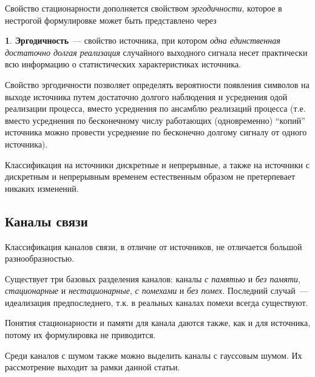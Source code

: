 \documentclass[12pt,a4paper,openright]{book}
\theoremstyle{definition}
\newtheorem{definition}{\textls[150]{Определение}}[chapter]
\numberwithin{equation}{chapter}
\begin{document}
	Свойство стационарности дополняется свойством \textit{эргодичности}, которое в нестрогой формулировке может быть представлено через
	\begin{definition}
		\textbf{Эргодичность}~--- свойство источника, при котором \textit{одна единственная достаточно долгая реализация} случайного выходного сигнала несет практически всю информацию о статистических характеристиках источника.
	\end{definition}
	Свойство эргодичности позволяет определять вероятности появления символов на выходе источника путем достаточно долгого наблюдения и усреднения одой реализации процесса, вместо усреднения по ансамблю реализаций процесса (т.е. вместо усреднения по бесконечному числу работающих (одновременно) ``копий'' источника можно провести усреднение по бесконечно долгому сигналу от одного источника).

	Классификация на источники дискретные и непрерывные, а также на источники с дискретным и непрерывным временем естественным образом не претерпевает никаких изменений.





	\subsection{Каналы связи}

	Классификация каналов связи, в отличие от источников, не отличается большой разнообразностью.

	Существует три базовых разделения каналов: каналы \textit{с памятью} и \textit{без памяти}, \textit{стационарные} и \textit{нестационарные}, \textit{с помехами} и \textit{без помех}. Последний случай~--- идеализация предпоследнего, т.к. в реальных каналах помехи всегда существуют.

	Понятия стационарности и памяти для канала даются также, как и для источника, потому их формулировка не приводится.

	Среди каналов с шумом также можно выделить каналы с гауссовым шумом. Их рассмотрение выходит за рамки данной статьи.
\end{document}
